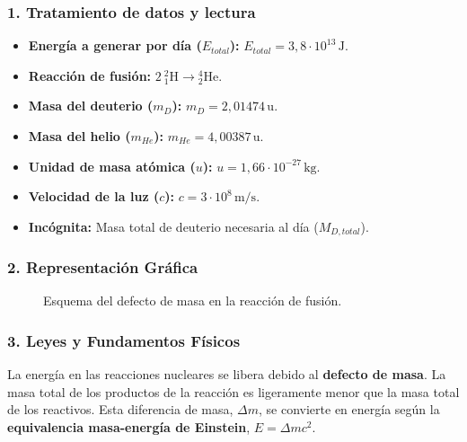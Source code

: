 \subsubsection*{1. Tratamiento de datos y lectura}
\begin{itemize}
    \item \textbf{Energía a generar por día ($E_{total}$):} $E_{total} = 3,8 \cdot 10^{13}\,\text{J}$.
    \item \textbf{Reacción de fusión:} $2 \ {}_{1}^{2}\text{H} \to {}_{2}^{4}\text{He}$.
    \item \textbf{Masa del deuterio ($m_D$):} $m_D = 2,01474\,\text{u}$.
    \item \textbf{Masa del helio ($m_{He}$):} $m_{He} = 4,00387\,\text{u}$.
    \item \textbf{Unidad de masa atómica ($u$):} $u=1,66\cdot10^{-27}\,\text{kg}$.
    \item \textbf{Velocidad de la luz ($c$):} $c=3\cdot10^{8}\,\text{m/s}$.
    \item \textbf{Incógnita:} Masa total de deuterio necesaria al día ($M_{D, total}$).
\end{itemize}

\subsubsection*{2. Representación Gráfica}
\begin{figure}[H]
    \centering
    \caption{Esquema del defecto de masa en la reacción de fusión.}
\end{figure}

\subsubsection*{3. Leyes y Fundamentos Físicos}
La energía en las reacciones nucleares se libera debido al \textbf{defecto de masa}. La masa total de los productos de la reacción es ligeramente menor que la masa total de los reactivos. Esta diferencia de masa, $\Delta m$, se convierte en energía según la \textbf{equivalencia masa-energía de Einstein}, $E=\Delta m c^2$.

